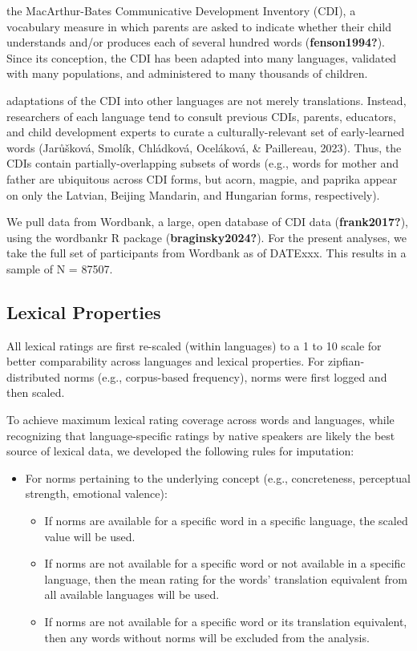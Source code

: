 \documentclass[
  man,floatsintext]{apa6}
\begin{document}
the MacArthur-Bates Communicative Development Inventory (CDI), a vocabulary measure in which parents are asked to indicate whether their child understands and/or produces each of several hundred words (\textbf{fenson1994?}). Since its conception, the CDI has been adapted into many languages, validated with many populations, and administered to many thousands of children.

adaptations of the CDI into other languages are not merely translations. Instead, researchers of each language tend to consult previous CDIs, parents, educators, and child development experts to curate a culturally-relevant set of early-learned words (Jarůšková, Smolík, Chládková, Oceláková, \& Paillereau, 2023). Thus, the CDIs contain partially-overlapping subsets of words (e.g., words for mother and father are ubiquitous across CDI forms, but acorn, magpie, and paprika appear on only the Latvian, Beijing Mandarin, and Hungarian forms, respectively).

We pull data from Wordbank, a large, open database of CDI data (\textbf{frank2017?}), using the wordbankr R package (\textbf{braginsky2024?}). For the present analyses, we take the full set of participants from Wordbank as of DATExxx. This results in a sample of N = 87507.

\hypertarget{lexical-properties}{%
\subsection{Lexical Properties}\label{lexical-properties}}

All lexical ratings are first re-scaled (within languages) to a 1 to 10 scale for better comparability across languages and lexical properties. For zipfian-distributed norms (e.g., corpus-based frequency), norms were first logged and then scaled.

To achieve maximum lexical rating coverage across words and languages, while recognizing that language-specific ratings by native speakers are likely the best source of lexical data, we developed the following rules for imputation:

\begin{itemize}
\item
  For norms pertaining to the underlying concept (e.g., concreteness, perceptual strength, emotional valence):

  \begin{itemize}
  \item
    If norms are available for a specific word in a specific language, the scaled value will be used.
  \item
    If norms are not available for a specific word or not available in a specific language, then the mean rating for the words' translation equivalent from all available languages will be used.
  \item
    If norms are not available for a specific word or its translation equivalent, then any words without norms will be excluded from the analysis.
  \end{itemize}
\end{itemize}
\end{document}
